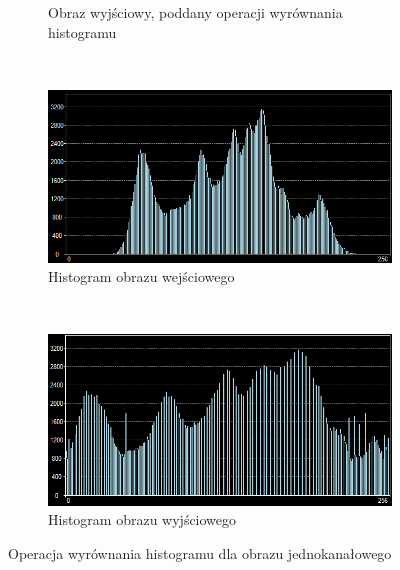 \begin{figure}
\begin{subfigure}[b]{0.45\textwidth}
    \caption{Obraz wyjściowy, poddany operacji wyrównania histogramu}
    \label{fig:equalize_histogram_after}
  \end{subfigure}
  ~
  \begin{subfigure}[b]{0.45\textwidth}
    \includegraphics[width=\textwidth]{img/equalize-histogram-histogram-before}
    \caption{Histogram obrazu wejściowego}
    \label{fig:equalize_histogram_histogram_before}
  \end{subfigure}
  ~
  \begin{subfigure}[b]{0.45\textwidth}
    \includegraphics[width=\textwidth]{img/equalize-histogram-histogram-after}
    \caption{Histogram obrazu wyjściowego}
    \label{fig:equalize_histogram_histogram_after}
  \end{subfigure}
  \caption{Operacja wyrównania histogramu dla obrazu jednokanałowego}\label{fig:equalize_histogram}
\end{figure}

